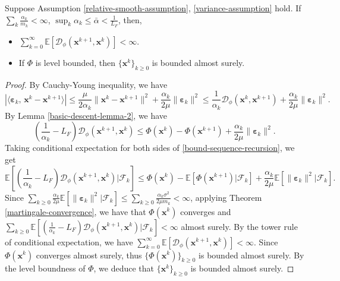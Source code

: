\documentclass[twoside,11pt]{article}
\newcommand{\E}{\mathbb{E}}
\newcommand{\cD}{\mathcal D}
\newcommand{\cF}{\mathcal F}
\def\inprod#1#2{\langle#1,\,#2\rangle}
\def\vx{{\bm{x}}}
\begin{document}
\begin{lemma}
Suppose Assumption \ref{relative-smooth-assumption}, \ref{variance-assumption} hold. If $\sum_k\frac{\alpha_k}{m_k}<\infty$, $\sup_k\alpha_k\leq\bar\alpha<\frac{1}{L_F}$, then,
 \begin{itemize}
     \item[1.] $\sum_{k=0}^\infty \E[\cD_\phi({\vx^{k+1}},{\vx^k})]<\infty$.
     \item[2.] If $\Phi$ is level bounded, then $\{{\vx^k}\}_{k\geq0}$ is bounded almost surely.
   \end{itemize}
   \label{bounded sequence-vanilla}
\end{lemma}
\begin{proof}
By Cauchy-Young inequality, we have 
\[
|\inprod{{\bm\varepsilon}_k}{{\vx^k}-{\vx^{k+1}}}|\leq\frac{\mu}{2\alpha_k}\|{\vx^k}-{\vx^{k+1}}\|^2+\frac{\alpha_k}{2\mu}\|{\bm\varepsilon}_k\|^2\leq \frac{1}{\alpha_k}{\cD_\phi}({\vx^k},{\vx^{k+1}})+\frac{\alpha_k}{2\mu}\|{\bm\varepsilon}_k\|^2.
 \]
 By Lemma \ref{basic-descent-lemma-2}, we have
 \begin{equation}
 \left(\frac{1}{\alpha_k}-L_F\right){\cD_\phi}({\vx^{k+1}},{\vx^k})\leq\Phi({\vx^k})-\Phi({\vx^{k+1}})+\frac{\alpha_k}{2\mu}\|{\bm\varepsilon}_k\|^2.
 \label{bound-sequence-recursion}
 \end{equation}
Taking conditional expectation for both sides of \eqref{bound-sequence-recursion}, we get
\[
\E\left[\left(\frac{1}{\alpha_k}-L_F\right){\cD_\phi}({\vx^{k+1}},{\vx^k})|\cF_k\right]\leq\Phi({\vx^k})-\E[\Phi({\vx^{k+1}})|\cF_k]+\frac{\alpha_k}{2\mu}\E[\|{\bm\varepsilon}_k\|^2|\cF_k].
\]
Since $\sum_{k\geq0}\frac{\alpha_k}{2\mu}\E[\|{\bm\varepsilon}_k\|^2|\cF_k]\leq\sum_{k\geq0}\frac{\alpha_k\sigma^2}{2\mu m_k}<\infty$, applying Theorem \ref{martingale-convergence}, we have that $\Phi({\vx^k})$ converges and $\sum_{k\geq0}\E\left[\left(\frac{1}{\alpha_k}-L_F\right){\cD_\phi}({\vx^{k+1}},{\vx^k})|\cF_k\right]<\infty$  almost surely.  By the tower rule of conditional expectation, we have $\sum_{k=0}^\infty \E[{\cD_\phi}({\vx^{k+1}},{\vx^k})]<\infty$. Since $\Phi({\vx^k})$ converges {almost surely}, thus $\{\Phi({\vx^k})\}_{k\geq0}$ is bounded almost surely. By the level boundness of $\Phi$, we deduce that $\{{\vx^k}\}_{k\geq0}$ is bounded almost surely.
\end{proof}
\end{document}
